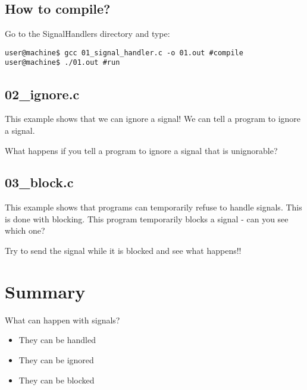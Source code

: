 \documentclass[12pt]{article}
\begin{document}

\subsection{How to compile?}
Go to the SignalHandlers directory and type:

\begin{lstlisting}
user@machine$ gcc 01_signal_handler.c -o 01.out #compile
user@machine$ ./01.out #run
\end{lstlisting}

\subsection{02\_ignore.c}
This example shows that we can ignore a signal! We can tell a program to ignore a signal. 

What happens if you tell a program to ignore a signal that is unignorable?


\subsection{03\_block.c}
This example shows that programs can temporarily refuse to handle signals. This is done with blocking. This program temporarily blocks a signal - can you see which one?

Try to send the signal while it is blocked and see what happens!!



\section{Summary}

What can happen with signals?

\begin{itemize}
\item They can be handled
\item They can be ignored
\item They can be blocked
\end{itemize}
\end{document}
